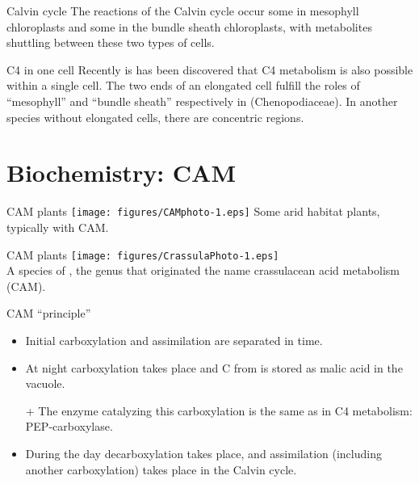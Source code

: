 \documentclass[10pt]{beamer}
\begin{document}
\begin{frame}{Calvin cycle}
    The reactions of the Calvin cycle occur some in mesophyll
    chloroplasts and some in the bundle sheath chloroplasts, with
    metabolites shuttling between these two types of cells.
\end{frame}

\begin{frame}{C4 in one cell}
    Recently is has been discovered that C4 metabolism is also
    possible within a single cell. The two ends of an elongated cell fulfill
    the roles of ``mesophyll'' and ``bundle sheath'' respectively in  (Chenopodiaceae). In another species without elongated cells, there
    are concentric regions.
\end{frame}

\section{Biochemistry: CAM}

\begin{frame}{CAM plants}
    \centering
    \texttt{[image: figures/CAMphoto-1.eps]}
    {\small Some arid habitat plants, typically with CAM.}
\end{frame}

\begin{frame}{CAM plants}
    \centering
    \texttt{[image: figures/CrassulaPhoto-1.eps]}\\
    {\small A species of , the genus that originated the name
    crassulacean acid metabolism (CAM).}
\end{frame}

\begin{frame}{CAM ``principle''}
    \begin{itemize}
        \item Initial carboxylation and assimilation are separated
        in time.
        \item At night carboxylation takes place and C from \COtwo is stored as
        malic acid in the vacuole.
        \item[+] The enzyme catalyzing this carboxylation is the
        same as in C4 metabolism: PEP-carboxylase.
        \item During the day decarboxylation takes place, and
        assimilation (including another carboxylation) takes place
        in the Calvin cycle.
    \end{itemize}
\end{frame}
\end{document}
